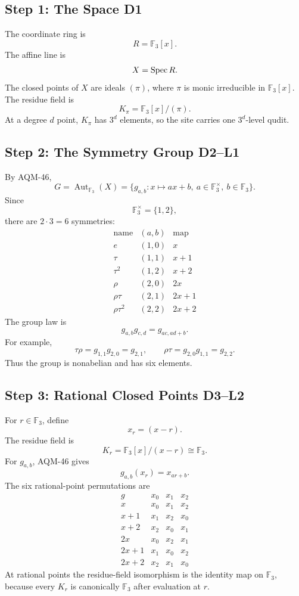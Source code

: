 \subsection{Step 1: The Space D1}
The coordinate ring is
\[
  R=\mathbb F_3[x].
\]
The affine line is
\[
  X=\operatorname{Spec} R.
\]
The closed points of \(X\) are ideals \((\pi)\), where \(\pi\) is monic
irreducible in \(\mathbb F_3[x]\).  The residue field is
\[
  K_\pi=\mathbb F_3[x]/(\pi).
\]
At a degree \(d\) point, \(K_\pi\) has \(3^d\) elements, so the site carries
one \(3^d\)-level qudit.
\subsection{Step 2: The Symmetry Group D2--L1}
By AQM-46,
\[
  G=\operatorname{Aut}_{\mathbb F_3}(X)
   =
  \{g_{a,b}:x\mapsto ax+b,\ a\in\mathbb F_3^\times,\ b\in\mathbb F_3\}.
\]
Since
\[
  \mathbb F_3^\times=\{1,2\},
\]
there are \(2\cdot3=6\) symmetries:
\[
\begin{array}{c|c|c}
\text{name}&(a,b)&\text{map}\\
\hline
e&(1,0)&x\\
\tau&(1,1)&x+1\\
\tau^2&(1,2)&x+2\\
\rho&(2,0)&2x\\
\rho\tau&(2,1)&2x+1\\
\rho\tau^2&(2,2)&2x+2
\end{array}
\]
The group law is
\[
  g_{a,b}g_{c,d}=g_{ac,ad+b}.
\]
For example,
\[
  \tau\rho=g_{1,1}g_{2,0}=g_{2,1},
  \qquad
  \rho\tau=g_{2,0}g_{1,1}=g_{2,2}.
\]
Thus the group is nonabelian and has six elements.
\subsection{Step 3: Rational Closed Points D3--L2}
For \(r\in\mathbb F_3\), define
\[
  x_r=(x-r).
\]
The residue field is
\[
  K_r=\mathbb F_3[x]/(x-r)\cong\mathbb F_3.
\]
For \(g_{a,b}\), AQM-46 gives
\[
  g_{a,b}(x_r)=x_{ar+b}.
\]
The six rational-point permutations are
\[
\begin{array}{c|ccc}
g&x_0&x_1&x_2\\
\hline
x&x_0&x_1&x_2\\
x+1&x_1&x_2&x_0\\
x+2&x_2&x_0&x_1\\
2x&x_0&x_2&x_1\\
2x+1&x_1&x_0&x_2\\
2x+2&x_2&x_1&x_0
\end{array}
\]
At rational points the residue-field isomorphism is the identity map on
\(\mathbb F_3\), because every \(K_r\) is canonically \(\mathbb F_3\) after
evaluation at \(r\).
